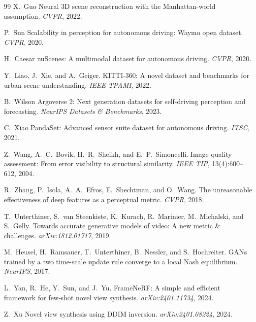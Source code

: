 \begin{thebibliography}{99}
X.~Guo \etal
Neural 3D scene reconstruction with the Manhattan-world assumption.
\emph{CVPR}, 2022.


P.~Sun \etal
Scalability in perception for autonomous driving: Waymo open dataset.
\emph{CVPR}, 2020.


H.~Caesar \etal
nuScenes: A multimodal dataset for autonomous driving.
\emph{CVPR}, 2020.


Y.~Liao, J.~Xie, and A.~Geiger.
KITTI-360: A novel dataset and benchmarks for urban scene understanding.
\emph{IEEE TPAMI}, 2022.


B.~Wilson \etal
Argoverse 2: Next generation datasets for self-driving perception and
forecasting.
\emph{NeurIPS Datasets \& Benchmarks}, 2023.


C.~Xiao \etal
PandaSet: Advanced sensor suite dataset for autonomous driving.
\emph{ITSC}, 2021.


Z.~Wang, A.~C.~Bovik, H.~R.~Sheikh, and E.~P.~Simoncelli.
Image quality assessment: From error visibility to structural similarity.
\emph{IEEE TIP}, 13(4):600--612, 2004.


R.~Zhang, P.~Isola, A.~A.~Efros, E.~Shechtman, and O.~Wang.
The unreasonable effectiveness of deep features as a perceptual metric.
\emph{CVPR}, 2018.


T.~Unterthiner, S.~van Steenkiste, K.~Kurach, R.~Marinier, M.~Michalski,
and S.~Gelly.
Towards accurate generative models of video: A new metric \& challenges.
\emph{arXiv:1812.01717}, 2019.


M.~Heusel, H.~Ramsauer, T.~Unterthiner, B.~Nessler, and S.~Hochreiter.
GANs trained by a two time-scale update rule converge to a local Nash
equilibrium.
\emph{NeurIPS}, 2017.



L.~Yan, R.~He, Y.~Sun, and J.~Yu.
FrameNeRF: A simple and efficient framework for few-shot novel view synthesis.
\emph{arXiv:2401.11734}, 2024.


Z.~Xu \etal
Novel view synthesis using DDIM inversion.
\emph{arXiv:2401.08224}, 2024.



\end{thebibliography}
